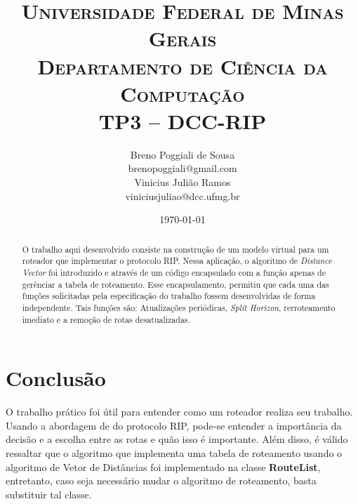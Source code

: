 \documentclass[10pt]{extarticle}
\title{ \textsc{Universidade Federal de Minas Gerais} \\ \textsc{Departamento de Ciência da Computação} \\ \bigskip TP3 -- DCC-RIP}
\author{Breno Poggiali de Sousa \\ \normalsize{brenopoggiali@gmail.com}\\
Vinicius Julião Ramos \\ \normalsize{viniciusjuliao@dcc.ufmg.br}}
\date{\today}
\begin{document}
\maketitle

\begin{abstract}
    O trabalho aqui desenvolvido consiste na construção de um modelo virtual
    para um roteador que implementar o protocolo RIP.
    Nessa aplicação, o algoritmo de \textit{Distance Vector} foi introduzido e
    através de um código encapsulado com a função apenas de gerênciar a tabela
    de roteamento.
    Esse encapsulamento, permitiu que cada uma das funções solicitadas pela
    especificação do trabalho fossem desenvolvidas de forma independente.
    Tais funções são: Atualizações periódicas, \textit{Split
    Horizon}, rerroteamento imediato e a remoção de rotas desatualizadas.
\end{abstract}





\section{Conclusão}
O trabalho prático foi útil para entender como um roteador realiza seu trabalho.
Usando a abordagem de do protocolo RIP, pode-se entender a importância da
decisão e a escolha entre as rotas e quão isso é importante.
Além disso, é válido ressaltar que o algoritmo que implementa uma tabela de
roteamento usando o algoritmo de Vetor de Distâncias foi implementado na classe
\textbf{RouteList}, entretanto, caso seja necessário mudar o algoritmo de roteamento,
basta substituir tal classe.
\end{document}
